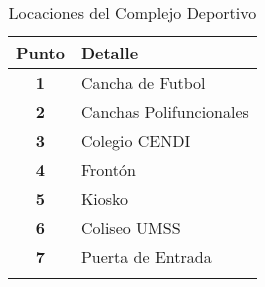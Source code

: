     \begin{longtable}{ c  X }
      \toprule
        \textbf{Punto} &
        \textbf{Detalle}\\

      \midrule
      \endhead

  \textbf{1}
  &
  Cancha de Futbol
  \\

  \addlinespace
  \textbf{2}
  &
  Canchas Polifuncionales
  \\

  \addlinespace
  \textbf{3}
  &
  Colegio CENDI
  \\

  \addlinespace
  \textbf{4}
  &
  Frontón
  \\

  \addlinespace
  \textbf{5}
  &
  Kiosko
  \\

  \addlinespace
  \textbf{6}
  &
  Coliseo UMSS
  \\

  \addlinespace
  \textbf{7}
  &
  Puerta de Entrada
  \\

      \bottomrule
      \caption{Locaciones del Complejo Deportivo}
      \label{tab:canchas}
    \end{longtable}
